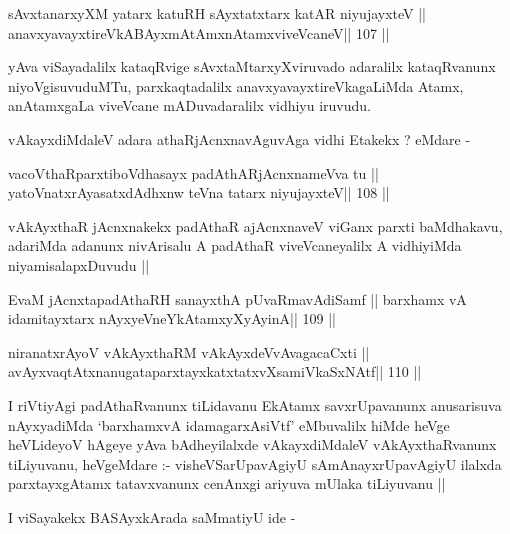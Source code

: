 \begin{shl}
sAvxtanarxyXM yatarx katuRH sAyxtatxtarx katAR niyujayxteV ||
\footnotemark[2]anavxyavayxtireVkABAyxmAtAmxnAtamxviveVcaneV\hfill || 107 ||
\end{shl}

\begin{artha}
yAva viSayadalilx kataqRvige sAvxtaMtarxyXviruvado adaralilx
kataqRvanunx niyoVgisuvuduMTu, parxkaqtadalilx
anavxyavayxtireVkagaLiMda Atamx, anAtamxgaLa viveVcane mADuvadaralilx
vidhiyu iruvudu.
\end{artha}

\begin{artha}
vAkayxdiMdaleV adara athaRjAcnxnavAguvAga vidhi Etakekx ? eMdare -
\end{artha}

\begin{shl}
vacoVthaRparxtiboVdhasayx padAthARjAcnxnameVva tu ||
yatoV\s natxrAyasatxdAdhxnw teVna tatarx niyujayxteV\hfill || 108 ||
\end{shl}

\begin{artha}
vAkAyxthaR jAcnxnakekx padAthaR ajAcnxnaveV viGanx parxti baMdhakavu,
adariMda adanunx nivArisalu A padAthaR viveVcaneyalilx A vidhiyiMda
niyamisalapxDuvudu ||
\end{artha}

\begin{shl}
EvaM jAcnxtapadAthaRH sanayxthA pUvaRmavAdiSamf ||
barxhamx vA idamitayxtarx nAyxyeVneYkAtamxyXyAyinA\hfill || 109 ||
\end{shl}

\begin{shl}
niranatxrAyoV vAkAyxthaRM vAkAyxdeVvAvagacaCxti ||
avAyxvaqtAtxnanugataparxtayxkatxtatxvXsamiVkaSxNAtf\hfill || 110 ||
\end{shl}

\begin{artha}
I riVtiyAgi padAthaRvanunx tiLidavanu EkAtamx savxrUpavanunx
anusarisuva nAyxyadiMda `barxhamxvA idamagarxAsiVtf' eMbuvalilx hiMde
heVge heVLideyoV hAgeye yAva bAdheyilalxde vAkayxdiMdaleV
vAkAyxthaRvanunx tiLiyuvanu, heVgeMdare :- visheVSarUpavAgiyU
sAmAnayxrUpavAgiyU ilalxda parxtayxgAtamx tatavxvanunx cenAnxgi
ariyuva mUlaka tiLiyuvanu ||
\end{artha}

\begin{artha}
I viSayakekx BASAyxkArada saMmatiyU ide -
\end{artha}

